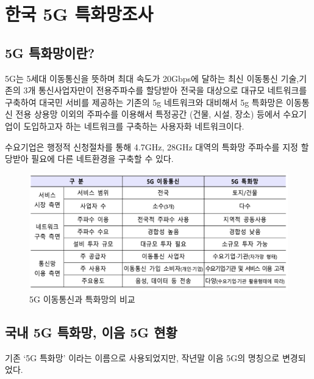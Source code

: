 \section{한국 5G 특화망조사}
\subsection{5G 특화망이란?}
5G는 5세대 이동통신을 뜻하며 최대 속도가 20Gbps에 달하는 최신 이동통신 기술,기존의 3개 통신사업자만이 전용주파수를 할당받아 전국을 대상으로 대규모 네트워크를 구축하여 대국민 서비를 제공하는 기존의 5g 네트워크와 대비해서 5g 특화망은 이동통신 전용 상용망 이외의 주파수를 이용해서 특정공간 (건물, 시설, 장소) 등에서 수요기업이 도입하고자 하는 네트워크를 구축하는 사용자화 네트워크이다.  

수요기업은 행정적 신청절차를 통해 4.7GHz, 28GHz 대역의 특화망 주파수를 지정 할당받아 필요에 다른 네트환경을 구축할 수 있다.\\
    \vspace{-4mm}
    \begin{figure}[!h]\centering
		\includegraphics[width=.75\textwidth]{image/week03/2-1.png}
		\caption{\small 5G 이동통신과 특화망의 비교}
		\vspace{-10pt}
    \end{figure}
\clearpage
\subsection{국내 5G 특화망, 이음 5G 현황}
기존 ‘5G 특화망’ 이라는 이름으로 사용되었지만, 작년말 이음 5G의 명칭으로 변경되었다. 
